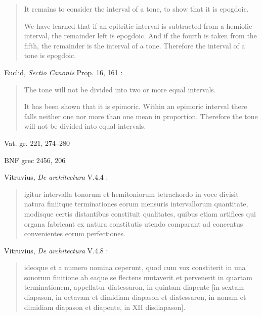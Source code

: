 \documentclass{article}
\theoremstyle{definition}
\begin{document}
\begin{quote}
It remains to consider the interval of a tone, to
show that it is epogdoic.

We have learned that if an epitritic interval is subtracted from a hemiolic
interval, the remainder left is epogdoic. And if the fourth is taken from the
fifth, the remainder is the interval of a tone. Therefore the interval of a tone
is epogdoic.
\end{quote}

Euclid, {\em Sectio Canonis} Prop. 16, 161 \cite[p.~202]{barker}:

\begin{quote}
The tone will not be divided into two or more
equal intervals.

It has been shown that it is epimoric. Within an epimoric interval there falls
neither one nor more than one mean in proportion. Therefore the tone will
not be divided into equal intervals.
\end{quote}

Vat. gr. 221, 274--280

BNF grec 2456, 206




























Vitruvius, {\em De architectura} V.4.4 \cite{vitruvius}:

\begin{quote}
igitur intervalla tonorum et hemitoniorum tetrachordo in voce divisit natura finiitque terminationes eorum mensuris intervallorum quantitate, modisque certis distantibus constituit qualitates, quibus etiam artifices qui organa fabricant ex natura constitutis utendo comparant ad concentus convenientes eorum perfectiones.
\end{quote}

Vitruvius, {\em De architectura} V.4.8 \cite{vitruvius}:

\begin{quote}
ideoque et a numero nomina ceperunt, quod cum vox constiterit in una sonorum finitione ab eaque se flectens mutaverit et pervenerit in quartam terminationem, appellatur diatessaron, in quintam diapente [in sextam diapason, in octavam et dimidiam diapason et diatessaron, in nonam et dimidiam diapason et diapente, in XII disdiapason].
\end{quote}
\end{document}
